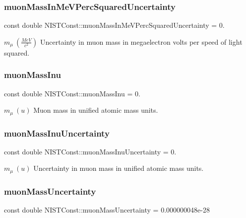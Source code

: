 \subsubsection{\texorpdfstring{muon\+Mass\+In\+Me\+V\+Perc\+Squared\+Uncertainty}{muonMassInMeVPercSquaredUncertainty}}
{\footnotesize\ttfamily const double N\+I\+S\+T\+Const\+::muon\+Mass\+In\+Me\+V\+Perc\+Squared\+Uncertainty = 0.}

$m_\mu \ (\frac{MeV}{c^2})$ Uncertainty in muon mass in megaelectron volts per speed of light squared. \mbox{\label{group___muon_gaa24722892f878b56a8aa97cca27ed908}} 
\subsubsection{\texorpdfstring{muon\+Mass\+Inu}{muonMassInu}}
{\footnotesize\ttfamily const double N\+I\+S\+T\+Const\+::muon\+Mass\+Inu = 0.}

$m_\mu \ (u)$ Muon mass in unified atomic mass units. \mbox{\label{group___muon_ga55f39b59c02eb2265b4d62332643a439}} 
\subsubsection{\texorpdfstring{muon\+Mass\+Inu\+Uncertainty}{muonMassInuUncertainty}}
{\footnotesize\ttfamily const double N\+I\+S\+T\+Const\+::muon\+Mass\+Inu\+Uncertainty = 0.}

$m_\mu \ (u)$ Uncertainty in muon mass in unified atomic mass units. \mbox{\label{group___muon_ga9e5356c55812a9d313f3d6b5a5eca437}} 
\subsubsection{\texorpdfstring{muon\+Mass\+Uncertainty}{muonMassUncertainty}}
{\footnotesize\ttfamily const double N\+I\+S\+T\+Const\+::muon\+Mass\+Uncertainty = 0.\+000000048e-\/28}

